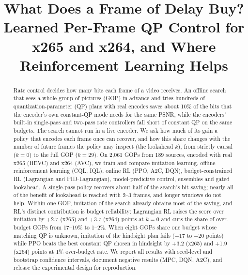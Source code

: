 \documentclass[conference]{IEEEtran}
\begin{document}
\title{What Does a Frame of Delay Buy? Learned Per-Frame QP Control for x265 and x264, and Where Reinforcement Learning Helps}

\author{
}

\maketitle

\begin{abstract}
Rate control decides how many bits each frame of a video receives. An offline search that sees a whole group of pictures (GOP) in advance and tries hundreds of quantization-parameter (QP) plans with real encodes saves about 10\% of the bits that the encoder's own constant-QP mode needs for the same PSNR, while the encoders' built-in single-pass and two-pass rate controllers fall short of constant QP on the same budgets. The search cannot run in a live encoder. We ask how much of its gain a policy that encodes each frame once can recover, and how this share changes with the number of future frames the policy may inspect (the lookahead $k$), from strictly causal ($k{=}0$) to the full GOP ($k{=}29$). On 2{,}061 GOPs from 189 sources, encoded with real x265 (HEVC) and x264 (AVC), we train and compare imitation learning, offline reinforcement learning (CQL, IQL), online RL (PPO, A2C, DQN), budget-constrained RL (Lagrangian and PID-Lagrangian), model-predictive control, ensembles and gated lookahead. A single-pass policy recovers about half of the search's bit saving; nearly all of the benefit of lookahead is reached with 2--3 frames, and longer windows do not help. Within one GOP, imitation of the search already obtains most of the saving, and RL's distinct contribution is budget reliability: Lagrangian RL raises the score over imitation by +2.7 (x265) and +3.7 (x264) points at $k{=}0$ and cuts the share of over-budget GOPs from 17--19\% to 1--2\%. When eight GOPs share one budget whose matching QP is unknown, imitation of the hindsight plan fails ($-17$ to $-20$ points) while PPO beats the best constant QP chosen in hindsight by +3.2 (x265) and +1.9 (x264) points at 1\% over-budget rate. We report all results with seed-level and bootstrap confidence intervals, document negative results (MPC, DQN, A2C), and release the experimental design for reproduction.
\end{abstract}
\end{document}

